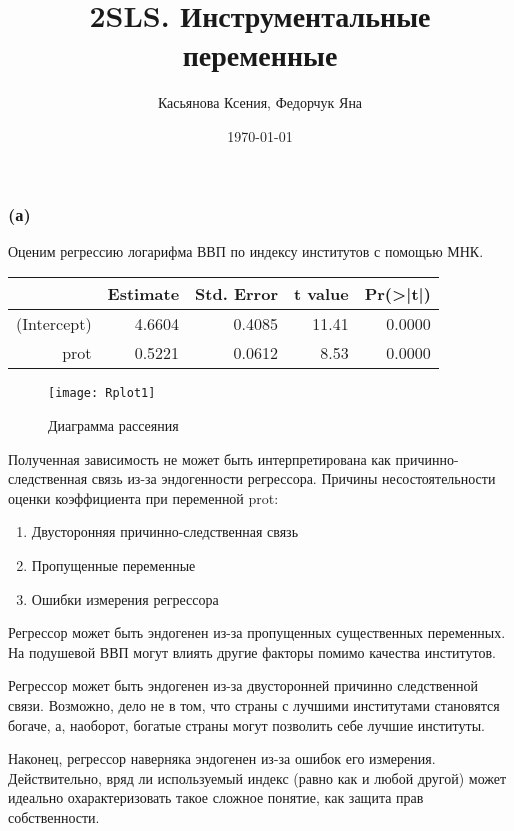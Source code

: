 \documentclass[a4paper,12pt]{article} %
\author{Касьянова Ксения, Федорчук Яна  }
\title{2SLS. Инструментальные переменные}
\date{\today}
\begin{document}
\maketitle

\subsubsection*{(а)}	
	
Оценим регрессию логарифма ВВП по индексу институтов с помощью МНК.
	
	
\begin{table}[h!]
	\centering
	\begin{tabular}{rrrrr}
		\hline
		& Estimate & Std. Error & t value & Pr(>|t|) \\ 
		\hline
		(Intercept) & 4.6604 & 0.4085 & 11.41 & 0.0000 \\ 
		prot & 0.5221 & 0.0612 & 8.53 & 0.0000 \\ 
		\hline
	\end{tabular}
\end{table}	
	
\begin{figure}[h!]
	\centering
	\texttt{[image: Rplot1]}
	\caption[Диаграмма рассеяния]{Диаграмма рассеяния}
	\label{fig:rplot1}
\end{figure}



Полученная зависимость не может быть интерпретирована как
причинно-следственная связь из-за  эндогенности  регрессора. 
Причины несостоятельности оценки коэффициента при переменной prot:
\begin{enumerate}
	\item Двусторонняя причинно-следственная связь
\item Пропущенные переменные
\item Ошибки измерения регрессора
\end{enumerate}	
	
	
Регрессор может быть эндогенен из-за пропущенных существенных
	переменных. На подушевой ВВП могут влиять другие факторы помимо 	качества институтов.

	
Регрессор может быть эндогенен из-за двусторонней причинно 	следственной связи. Возможно, дело не в том, что страны с лучшими
 институтами становятся богаче, а, наоборот, богатые страны могут позволить себе лучшие институты.


Наконец, регрессор наверняка эндогенен из-за ошибок его измерения. Действительно, вряд ли используемый индекс (равно как и любой
другой) может идеально охарактеризовать такое сложное понятие, как
защита прав собственности.
\end{document}
